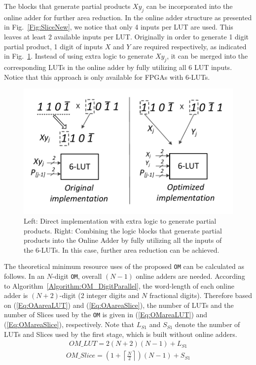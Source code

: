 \documentclass[conference]{IEEEtran}
\begin{document}
The blocks that generate partial products $Xy_j$ can be incorporated into the online adder for further area reduction. In the online adder structure as presented in Fig.~\ref{Fig:SliceNew}, we notice that only 4 inputs per LUT are used. This leaves at least 2 available inputs per LUT. Originally in order to generate 1 digit partial product, 1 digit of inputs $X$ and $Y$ are required respectively, as indicated in Fig.~\ref{Fig:PartialProduct}. Instead of using extra logic to generate $Xy_j$, it can be merged into the corresponding LUTs in the online adder by fully utilizing all 6 LUT inputs. Notice that this approach is only available for FPGAs with 6-LUTs.
%
\begin{figure}[tbp]
	\centering
	\includegraphics[width=.4\textwidth]{./Figures/PartialProduct.pdf}
	\vspace{-1ex}
	\caption{Left: Direct implementation with extra logic to generate partial products. Right: Combining the logic blocks that generate partial products into the Online Adder by fully utilizing all the inputs of the 6-LUTs. In this case, further area reduction can be achieved.}
	\label{Fig:PartialProduct}
	\vspace{-1ex}
\end{figure}

The theoretical minimum resource uses of the proposed \texttt{OM} can be calculated as follows. In an $N$-digit \texttt{OM}, overall $(N-1)$ online adders are needed. According to Algorithm~\ref{Algorithm:OM_DigitParallel}, the word-length of each online adder is $(N+2)$-digit (2 integer digits and $N$ fractional digits). Therefore based on (\ref{Eq:OAareaLUT}) and (\ref{Eq:OAareaSlice}), the number of LUTs and the number of Slices used by the \texttt{OM} is given in (\ref{Eq:OMareaLUT}) and (\ref{Eq:OMareaSlice}), respectively. Note that $L_{S1}$ and $S_{S1}$ denote the number of LUTs and Slices used by the first stage, which is built without online adders.
%
\begin{eqnarray}\label{Eq:OMareaLUT}
	OM\_{LUT} = 2(N+2)(N-1) + {L}_{S1}
\end{eqnarray}
%
\begin{eqnarray}\label{Eq:OMareaSlice}
	OM\_{Slice} = (1+\left\lceil{\frac{N}{2}}\right\rceil)(N-1)+S_{S1}
\end{eqnarray}
\end{document}
